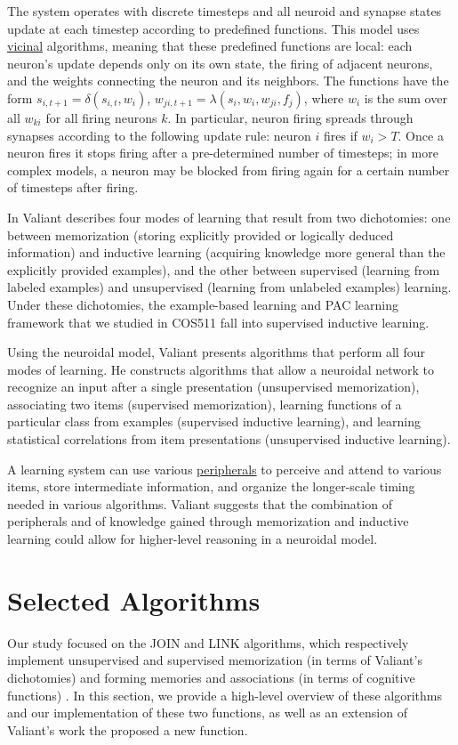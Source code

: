 \documentclass[letterpaper, 12pt]{article}
\begin{document}
The system operates with discrete timesteps and all neuroid and synapse states update at each timestep according to predefined functions. This model uses \underline{vicinal} algorithms, meaning that these predefined functions are local: each neuron's update depends only on its own state, the firing of adjacent neurons, and the weights connecting the neuron and its neighbors. The functions have the form $s_{i,t+1}=\delta(s_{i,t},w_i)$, $w_{ji,t+1}=\lambda(s_i,w_i,w_{ji},f_j)$, where $w_i$ is the sum over all $w_{ki}$ for all firing neurons $k$. In particular, neuron firing spreads through synapses according to the following update rule: neuron $i$ fires if $w_i>T$. Once a neuron fires it stops firing after a pre-determined number of timesteps; in more complex models, a neuron may be blocked from firing again for a certain number of timesteps after firing.

In \cite{valiant_circuits_1994} Valiant describes four modes of learning that result from two dichotomies: one between memorization (storing explicitly provided or logically deduced information) and inductive learning (acquiring knowledge more general than the explicitly provided examples), and the other between supervised (learning from labeled examples) and unsupervised (learning from unlabeled examples) learning. Under these dichotomies, the example-based learning and PAC learning framework that we studied in COS511 fall into supervised inductive learning.

Using the neuroidal model, Valiant presents algorithms that perform all four modes of learning. He constructs algorithms that allow a neuroidal network to recognize an input after a single presentation (unsupervised memorization), associating two items (supervised memorization), learning functions of a particular class from examples (supervised inductive learning), and learning statistical correlations from item presentations (unsupervised inductive learning).

A learning system can use various \underline{peripherals} to perceive and attend to various items, store intermediate information, and organize the longer-scale timing needed in various algorithms. Valiant suggests that the combination of peripherals and of knowledge gained through memorization and inductive learning could allow for higher-level reasoning in a neuroidal model.

\section{Selected Algorithms}\label{sec:selected_algorithms}
Our study focused on the JOIN and LINK algorithms, which respectively implement unsupervised and supervised memorization (in terms of Valiant's dichotomies) and forming memories and associations (in terms of cognitive functions) \cite{valiant_circuits_1994, papadimitriou_cortical_2015}. In this section, we provide a high-level overview of these algorithms and our implementation of these two functions, as well as an extension of Valiant's work the proposed a new function.
\end{document}
